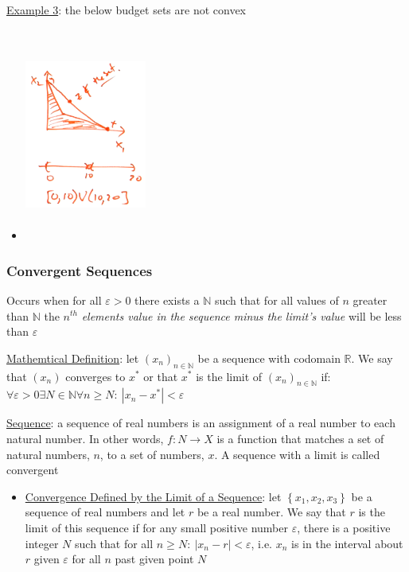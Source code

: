 \documentclass{article}
\begin{document}
  \par
  \underline{Example 3}: the below budget sets are not convex
  \begin{itemize}
    \item  \includegraphics[width=4cm, height=7cm]{pic15}
  \end{itemize}
\vspace{6mm}
\subsubsection{Convergent Sequences}
Occurs when for all $\varepsilon > 0$ there exists a $\mathbb{N}$ such that for all values of $n$ greater than $\mathbb{N}$ the $n^{th}$ \textit{elements value in the sequence minus the limit's value} will be less than $\varepsilon$ \par \vspace{0.3em}
  \underline{Mathemtical Definition}: let $(x_{n})_{n \in \mathbb{N}}$ be a sequence with codomain $\mathbb{R}$. We say that $(x_{n})$ converges to $x^{*}$ or that $x^{*}$ is the limit of $(x_{n})_{n \in \mathbb{N}}$ if: $\forall \varepsilon > 0 \exists N \in \mathbb{N} \forall n \geq N: \ |x_{n} - x^{*}| < \varepsilon$ \par
  \underline{Sequence}: a sequence of real numbers is an assignment of a real number to each natural number. In other words, $f: N \rightarrow X$ is a function that matches a set of natural numbers, $n$, to a set of numbers, $x$. A sequence with a limit is called convergent
  \begin{itemize}
    \item  \underline{Convergence Defined by the Limit of a Sequence}: let $\left\{ x_{1}, x_{2}, x_{3} \right\}$  be a sequence of real numbers and let $r$ be a real number. We say that $r$ is the limit of this sequence if for any small positive number $\varepsilon$, there is a positive integer $N$ such that for all $n \geq N: \ |x_{n} - r| < \varepsilon$, i.e. $x_{n}$ is in the interval about $r$ given $\varepsilon$ for all $n$ past given point $N$
  \end{itemize}
  \par
\vspace{6mm}
\end{document}
